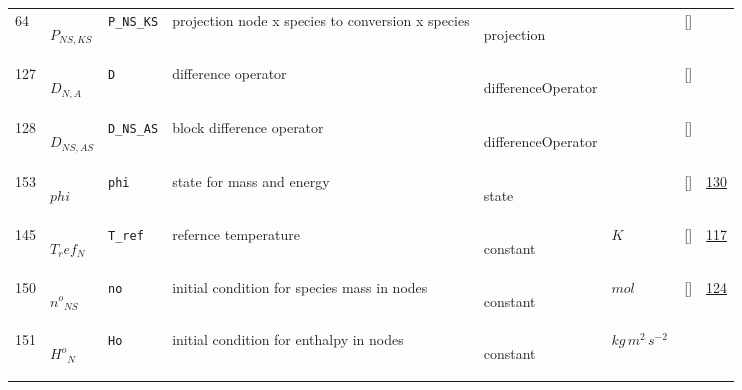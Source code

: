 \begin{longtable}{|p{1cm}|p{3cm}|p{3cm}|p{7cm}|p{3.0cm}|p{3cm}|p{2cm}|p{1cm}|}
    64
             & \hypertarget{"v:64"}{ $ {P}{_{{N S}, {K S}}} $}
             & \verb|P_NS_KS|
             & projection node x species to conversion x species
             & \begin{lay}projection \end{lay}
             & $  $
             & []
             & \\
    127
             & \hypertarget{"v:127"}{ $ {D}{_{N, A}} $}
             & \verb|D|
             & difference operator
             & \begin{lay}differenceOperator \end{lay}
             & $  $
             & []
             & \\
    128
             & \hypertarget{"v:128"}{ $ {D}{_{{N S}, {A S}}} $}
             & \verb|D_NS_AS|
             & block difference operator
             & \begin{lay}differenceOperator \end{lay}
             & $  $
             & []
             & \\
    153
             & \hypertarget{"v:153"}{ $ {phi}{_{}} $}
             & \verb|phi|
             & state for mass and energy
             & \begin{lay}state \end{lay}
             & $  $
             & []
             & \hyperlink{"e:130"}{ 130 }
                 \\
    145
             & \hypertarget{"v:145"}{ $ {T_ref}{_{N}} $}
             & \verb|T_ref|
             & refernce temperature
             & \begin{lay}constant \end{lay}
             & $ K \, $
             & []
             & \hyperlink{"e:117"}{ 117 }
                 \\
    150
             & \hypertarget{"v:150"}{ $ {{n^o}}{_{{N S}}} $}
             & \verb|no|
             & initial condition for species mass in nodes
             & \begin{lay}constant \end{lay}
             & $ mol \, $
             & []
             & \hyperlink{"e:124"}{ 124 }
                 \\
    151
             & \hypertarget{"v:151"}{ $ {{H^o}}{_{N}} $}
             & \verb|Ho|
             & initial condition for enthalpy in nodes
             & \begin{lay}constant \end{lay}
             & $ kg \,m^{2} \,s^{-2} \, $

\end{longtable}
